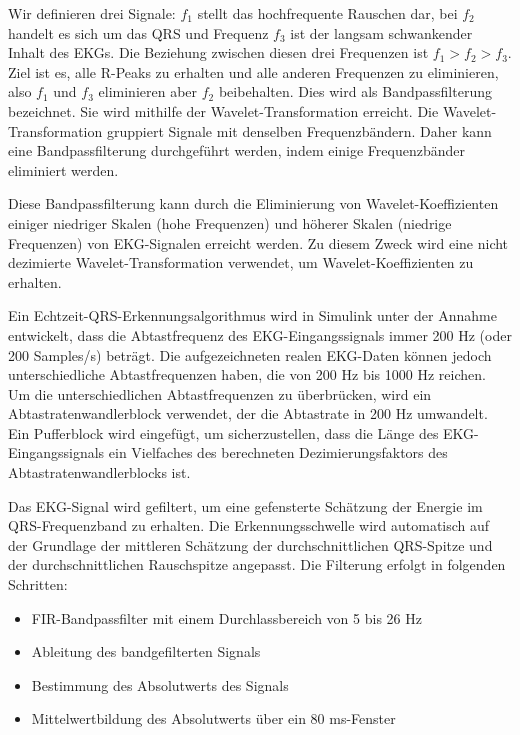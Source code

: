 \documentclass[a4paper,12pt,titlepage]{scrartcl}
\begin{document}
Wir definieren drei Signale: $f_1$ stellt das hochfrequente Rauschen dar, bei $f_2$ handelt es sich um das QRS und Frequenz $f_3$ ist der langsam schwankender Inhalt des EKGs. Die Beziehung zwischen diesen drei Frequenzen ist $f_1>f_2>f_3$.
Ziel ist es, alle R-Peaks zu erhalten und alle anderen Frequenzen zu eliminieren, also $f_1$ und $f_3$ eliminieren aber $f_2$ beibehalten. Dies wird als Bandpassfilterung bezeichnet. Sie wird mithilfe der Wavelet-Transformation erreicht. Die Wavelet-Transformation gruppiert Signale mit denselben Frequenzbändern. Daher kann eine Bandpassfilterung durchgeführt werden, indem einige Frequenzbänder eliminiert werden.

Diese Bandpassfilterung kann durch die Eliminierung von Wavelet-Koeffizienten einiger niedriger Skalen (hohe Frequenzen) und höherer Skalen (niedrige Frequenzen) von EKG-Signalen erreicht werden. Zu diesem Zweck wird eine nicht dezimierte Wavelet-Transformation verwendet, um Wavelet-Koeffizienten zu erhalten.

Ein Echtzeit-QRS-Erkennungsalgorithmus wird in Simulink unter der Annahme entwickelt, dass die Abtastfrequenz des EKG-Eingangssignals immer 200 Hz (oder 200 Samples/s) beträgt. Die aufgezeichneten realen EKG-Daten können jedoch unterschiedliche Abtastfrequenzen haben, die von 200 Hz bis 1000 Hz reichen. Um die unterschiedlichen Abtastfrequenzen zu überbrücken, wird ein Abtastratenwandlerblock verwendet, der die Abtastrate in 200 Hz umwandelt. Ein Pufferblock wird eingefügt, um sicherzustellen, dass die Länge des EKG-Eingangssignals ein Vielfaches des berechneten Dezimierungsfaktors des Abtastratenwandlerblocks ist.

Das EKG-Signal wird gefiltert, um eine gefensterte Schätzung der Energie im QRS-Frequenzband zu erhalten. Die Erkennungsschwelle wird automatisch auf der Grundlage der mittleren Schätzung der durchschnittlichen QRS-Spitze und der durchschnittlichen Rauschspitze angepasst. Die Filterung erfolgt in folgenden Schritten:
\begin{itemize}
    \item FIR-Bandpassfilter mit einem Durchlassbereich von 5 bis 26 Hz
    \item Ableitung des bandgefilterten Signals
    \item Bestimmung des Absolutwerts des Signals
    \item Mittelwertbildung des Absolutwerts über ein 80 ms-Fenster
\end{itemize}
\end{document}
